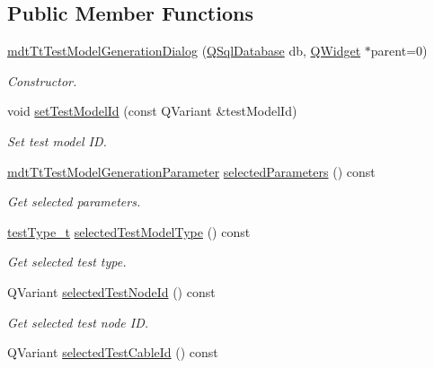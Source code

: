 \subsection*{Public Member Functions}
\begin{DoxyCompactItemize}
\item 
\hyperlink{classmdt_tt_test_model_generation_dialog_a41cf108d3dd4f65337b6ee821aa61f75}{mdt\-Tt\-Test\-Model\-Generation\-Dialog} (\hyperlink{class_q_sql_database}{Q\-Sql\-Database} db, \hyperlink{class_q_widget}{Q\-Widget} $\ast$parent=0)
\begin{DoxyCompactList}\small\item\em Constructor. \end{DoxyCompactList}\item 
void \hyperlink{classmdt_tt_test_model_generation_dialog_a8a96851eb1dbc343f8ca8b7fb7e2cd63}{set\-Test\-Model\-Id} (const Q\-Variant \&test\-Model\-Id)
\begin{DoxyCompactList}\small\item\em Set test model I\-D. \end{DoxyCompactList}\item 
\hyperlink{structmdt_tt_test_model_generation_parameter}{mdt\-Tt\-Test\-Model\-Generation\-Parameter} \hyperlink{classmdt_tt_test_model_generation_dialog_ae3a28f4788e45fc6877ccd3aabebf1f0}{selected\-Parameters} () const 
\begin{DoxyCompactList}\small\item\em Get selected parameters. \end{DoxyCompactList}\item 
\hyperlink{classmdt_tt_test_model_generation_dialog_a833486450bf0b6414015ab3b8e8432da}{test\-Type\-\_\-t} \hyperlink{classmdt_tt_test_model_generation_dialog_ad98f90e611b2ea423ddbd06fe8520ebd}{selected\-Test\-Model\-Type} () const 
\begin{DoxyCompactList}\small\item\em Get selected test type. \end{DoxyCompactList}\item 
Q\-Variant \hyperlink{classmdt_tt_test_model_generation_dialog_aaa97c8f06a9e983bb0b595df9f708855}{selected\-Test\-Node\-Id} () const 
\begin{DoxyCompactList}\small\item\em Get selected test node I\-D. \end{DoxyCompactList}\item 
Q\-Variant \hyperlink{classmdt_tt_test_model_generation_dialog_a96d923096ff088bb6c249e86d8ff1a6c}{selected\-Test\-Cable\-Id} () const 

\end{DoxyCompactItemize}

